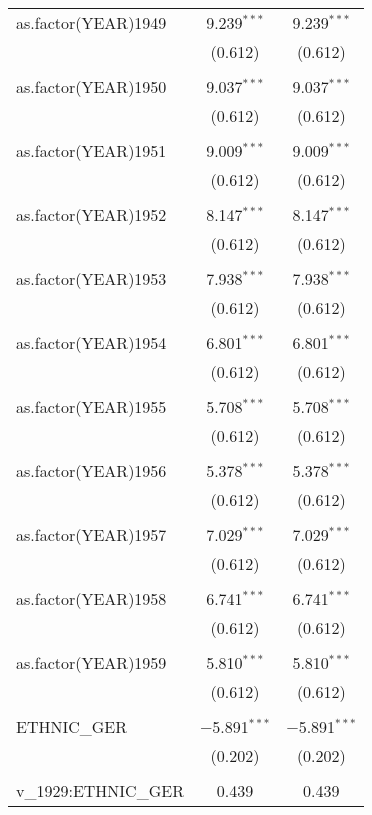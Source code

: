 \begin{table}[!htbp]
\begin{tabular}{@{\extracolsep{5pt}}lcc}
 as.factor(YEAR)1949 & 9.239$^{***}$ & 9.239$^{***}$ \\ 
  & (0.612) & (0.612) \\ 
  & & \\ 
 as.factor(YEAR)1950 & 9.037$^{***}$ & 9.037$^{***}$ \\ 
  & (0.612) & (0.612) \\ 
  & & \\ 
 as.factor(YEAR)1951 & 9.009$^{***}$ & 9.009$^{***}$ \\ 
  & (0.612) & (0.612) \\ 
  & & \\ 
 as.factor(YEAR)1952 & 8.147$^{***}$ & 8.147$^{***}$ \\ 
  & (0.612) & (0.612) \\ 
  & & \\ 
 as.factor(YEAR)1953 & 7.938$^{***}$ & 7.938$^{***}$ \\ 
  & (0.612) & (0.612) \\ 
  & & \\ 
 as.factor(YEAR)1954 & 6.801$^{***}$ & 6.801$^{***}$ \\ 
  & (0.612) & (0.612) \\ 
  & & \\ 
 as.factor(YEAR)1955 & 5.708$^{***}$ & 5.708$^{***}$ \\ 
  & (0.612) & (0.612) \\ 
  & & \\ 
 as.factor(YEAR)1956 & 5.378$^{***}$ & 5.378$^{***}$ \\ 
  & (0.612) & (0.612) \\ 
  & & \\ 
 as.factor(YEAR)1957 & 7.029$^{***}$ & 7.029$^{***}$ \\ 
  & (0.612) & (0.612) \\ 
  & & \\ 
 as.factor(YEAR)1958 & 6.741$^{***}$ & 6.741$^{***}$ \\ 
  & (0.612) & (0.612) \\ 
  & & \\ 
 as.factor(YEAR)1959 & 5.810$^{***}$ & 5.810$^{***}$ \\ 
  & (0.612) & (0.612) \\ 
  & & \\ 
 ETHNIC\_GER & $-$5.891$^{***}$ & $-$5.891$^{***}$ \\ 
  & (0.202) & (0.202) \\ 
  & & \\ 
 v\_1929:ETHNIC\_GER & 0.439 & 0.439 \\ 

\end{tabular}
\end{table}
